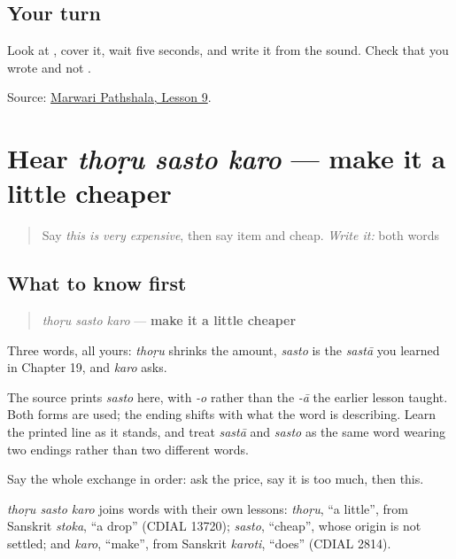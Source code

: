 \subsection*{Your turn}
Look at \textbf{}, cover it, wait five seconds, and write it from the sound. Check that you wrote \textbf{} and not \textbf{}.

\begin{tcolorbox}[breakable,colback=teal!4,colframe=teal!35!black,title={Before you move on}]
Source: \href{https://www.marwaripathshala.com/marwari-lesson-9-english}{Marwari Pathshala, Lesson 9}.
\end{tcolorbox}
\section[thoṛu sasto karo]{Hear \emph{thoṛu sasto karo} — make it a little cheaper}

\label{lesson:MW-C23-hear-bargain-request}



\begin{quote}
Say \emph{this is very expensive}, then say item and cheap. \emph{Write it:} both words
\end{quote}

\subsection*{What to know first}
\begin{quote}
\emph{thoṛu sasto karo} — \textbf{make it a little cheaper}
\end{quote}

Three words, all yours: \emph{thoṛu} shrinks the amount, \emph{sasto} is the \emph{sastā} you learned in Chapter 19, and \emph{karo} asks.

The source prints \emph{sasto} here, with \emph{-o} rather than the \emph{-ā} the earlier lesson taught. Both forms are used; the ending shifts with what the word is describing. Learn the printed line as it stands, and treat \emph{sastā} and \emph{sasto} as the same word wearing two endings rather than two different words.

Say the whole exchange in order: ask the price, say it is too much, then this.

\begin{cousinweb}
\emph{thoṛu sasto karo} joins words with their own lessons: \emph{thoṛu}, \textquotedblleft{}a little\textquotedblright{}, from Sanskrit \emph{stoka}, \textquotedblleft{}a drop\textquotedblright{} (CDIAL 13720); \emph{sasto}, \textquotedblleft{}cheap\textquotedblright{}, whose origin is not settled; and \emph{karo}, \textquotedblleft{}make\textquotedblright{}, from Sanskrit \emph{karoti}, \textquotedblleft{}does\textquotedblright{} (CDIAL 2814).
\end{cousinweb}

